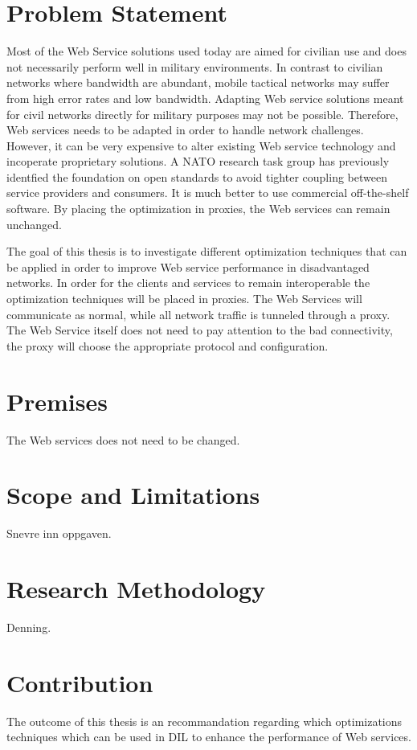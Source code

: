 \documentclass[USenglish]{ifimaster}
\begin{document}
\section{Problem Statement}
Most of the Web Service solutions used today are aimed for civilian use and does
not necessarily perform well in military environments. In contrast to civilian
networks where bandwidth are abundant, mobile tactical networks may suffer from
high error rates and low bandwidth. Adapting Web service solutions meant for
civil networks directly for military purposes may not be possible. Therefore,
Web services needs to be adapted in order to handle network challenges. However,
it can be very expensive to alter existing Web service technology and incoperate
proprietary solutions. A NATO research task group has previously identfied the
foundation on open standards to avoid tighter coupling between service providers
and consumers\cite{IST-090}. It is much better to use commercial off-the-shelf
software. By placing the optimization in proxies, the Web services can remain
unchanged.

The goal of this thesis is to investigate different optimization techniques that
can be applied in order to improve Web service performance in disadvantaged
networks. In order for the clients and services to remain interoperable the
optimization techniques will be placed in proxies. The Web Services will
communicate as normal, while all network traffic is tunneled through a proxy.
The Web Service itself does not need to pay attention to the bad connectivity,
the proxy will choose the appropriate protocol and configuration.

\section{Premises}
The Web services does not need to be changed.

\section{Scope and Limitations} Snevre inn oppgaven.

\section{Research Methodology}
Denning.

\section{Contribution}
The outcome of this thesis is an recommandation regarding which optimizations
techniques which can be used in DIL to enhance the performance of Web services.
\end{document}
